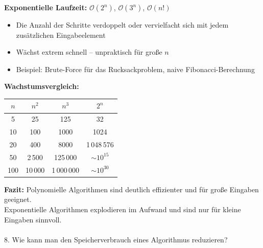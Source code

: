 \documentclass[a4paper,12pt]{article}
\begin{document}
		\vspace{0.5em}
		\textbf{Exponentielle Laufzeit:} \( \mathcal{O}(2^n) \), \( \mathcal{O}(3^n) \), \( \mathcal{O}(n!) \)
		
		\begin{itemize}
			\item Die Anzahl der Schritte verdoppelt oder vervielfacht sich mit jedem zusätzlichen Eingabeelement
			\item Wächst extrem schnell – unpraktisch für große \( n \)
			\item Beispiel: Brute-Force für das Rucksackproblem, naive Fibonacci-Berechnung
		\end{itemize}
		
		\vspace{1em}
		\textbf{Wachstumsvergleich:}
		
		\begin{center}
			\begin{tabular}{|c|c|c|c|}
				\hline
				\( n \) & \( n^2 \) & \( n^3 \) & \( 2^n \) \\
				\hline
				5      & 25        & 125       & 32 \\
				10     & 100       & 1000      & 1024 \\
				20     & 400       & 8000      & 1\,048\,576 \\
				50     & 2\,500    & 125\,000  & \(\sim 10^{15}\) \\
				100    & 10\,000   & 1\,000\,000 & \(\sim 10^{30}\) \\
				\hline
			\end{tabular}
		\end{center}
		
		\vspace{1em}
		\textbf{Fazit:} Polynomielle Algorithmen sind deutlich effizienter und für große Eingaben geeignet.\\
		Exponentielle Algorithmen explodieren im Aufwand und sind nur für kleine Eingaben sinnvoll.\\
		\\8. Wie kann man den Speicherverbrauch eines Algorithmus reduzieren?\\
		
\end{document}
